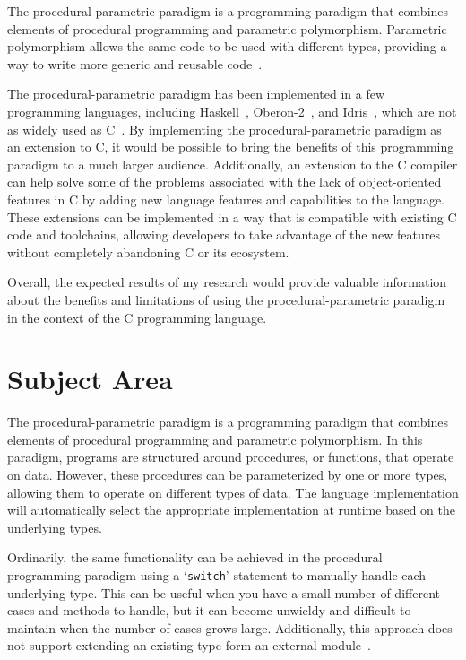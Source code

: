 \documentclass[conference]{IEEEtran}
\begin{document}
The procedural-parametric paradigm is a programming paradigm that combines elements of procedural programming and parametric polymorphism.
Parametric polymorphism allows the same code to be used with different types, providing a way to write more generic and reusable code~\cite{cardelli1985understanding}.

The procedural-parametric paradigm has been implemented in a few programming languages, including Haskell~\cite{hall1996type}, Oberon-2~\cite{mossenbock1991differences}, and Idris~\cite{brady2013idris}, which are not as widely used as C~\cite{bissyande2013popularity}.
By implementing the procedural-parametric paradigm as an extension to C, it would be possible to bring the benefits of this programming paradigm to a much larger audience.
Additionally, an extension to the C compiler can help solve some of the problems associated with the lack of object-oriented features in C by adding new language features and capabilities to the language.
These extensions can be implemented in a way that is compatible with existing C code and toolchains, allowing developers to take advantage of the new features without completely abandoning C or its ecosystem.

Overall, the expected results of my research would provide valuable information about the benefits and limitations of using the procedural-parametric paradigm in the context of the C programming language.


\section{Subject Area}
The procedural-parametric paradigm is a programming paradigm that combines elements of procedural programming and parametric polymorphism.
In this paradigm, programs are structured around procedures, or functions, that operate on data.
However, these procedures can be parameterized by one or more types, allowing them to operate on different types of data.
The language implementation will automatically select the appropriate implementation at runtime based on the underlying types.

Ordinarily, the same functionality can be achieved in the procedural programming paradigm using a `\texttt{switch}' statement to manually handle each underlying type.
This can be useful when you have a small number of different cases and methods to handle, but it can become unwieldy and difficult to maintain when the number of cases grows large.
Additionally, this approach does not support extending an existing type form an external module~\cite{legalov2016evolutionary}.
\end{document}
